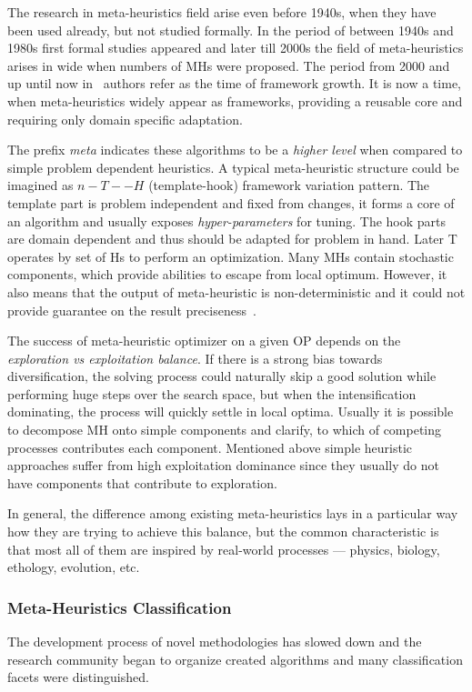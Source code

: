 The research in meta-heuristics field arise even before 1940s, when they have been used already, but not studied formally. In the period of between 1940s and 1980s first formal studies appeared and later till 2000s the field of meta-heuristics arises in wide when numbers of MHs were proposed. The period from 2000 and up until now in~\cite{sorensen2017history} authors refer as the time of framework growth. It is now a time, when meta-heuristics widely appear as frameworks, providing a reusable core and requiring only domain specific adaptation.

The prefix \textit{meta} indicates these algorithms to be a \textit{higher level} when compared to simple problem dependent heuristics. A typical meta-heuristic structure could be imagined as $n-T--H$ (template-hook) framework variation pattern. The template part is problem independent and fixed from changes, it forms a core of an algorithm and usually exposes \textit{hyper-parameters} for tuning. The hook parts are domain dependent and thus should be adapted for problem in hand. Later T operates by set of Hs to perform an optimization.
Many MHs contain stochastic components, which provide abilities to escape from local optimum. However, it also means that the output of meta-heuristic is non-deterministic and it could not provide guarantee on the result preciseness~\cite{boussaid2013survey}.

The success of meta-heuristic optimizer on a given OP depends on the \textit{exploration vs exploitation balance}. If there is a strong bias towards diversification, the solving process could naturally skip a good solution while performing huge steps over the search space, but when the intensification dominating, the process will quickly settle in local optima. Usually it is possible to decompose MH onto simple components and clarify, to which of competing processes contributes each component. Mentioned above simple heuristic approaches suffer from high exploitation dominance since they usually do not have components that contribute to exploration.

In general, the difference among existing meta-heuristics lays in a particular way how they are trying to achieve this balance, but the common characteristic is that most all of them are inspired by real-world processes — physics, biology, ethology, evolution, etc.


\subsubsection{Meta-Heuristics Classification}
The development process of novel methodologies has slowed down and the research community began to organize created algorithms and many classification facets were distinguished.

